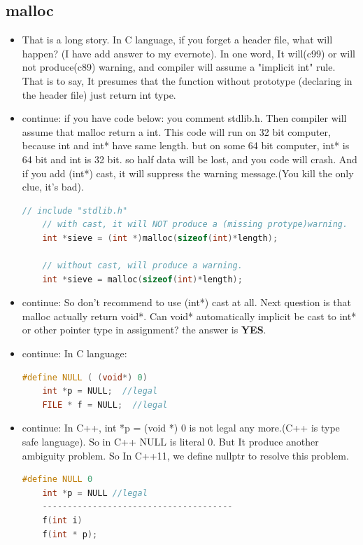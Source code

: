 \documentclass[a4paper,11pt,twoside]{book}
\begin{document}
\subsection{malloc}
\begin{itemize}
	\item That is a long story. In C language, if you forget a header file, what will happen? (I have add answer to my evernote). In one word, It will(c99) or will not produce(c89) warning, and compiler will assume a "implicit int" rule. That is to say, It presumes that the function without prototype (declaring in the header file) just return int type.
	
	\item continue: if you have code below: you comment stdlib.h. Then compiler will assume that malloc return a int.  This code will run on 32 bit computer, because int and int* have same length. but on some 64 bit computer, int* is 64 bit and int is 32 bit.  so half data will be lost, and you code will crash.
	And if you add (int*) cast, it will suppress the warning message.(You kill the only clue, it's bad).
	\begin{lstlisting}[frame=single, language=c++]
	// include "stdlib.h"
	// with cast, it will NOT produce a (missing protype)warning.
	int *sieve = (int *)malloc(sizeof(int)*length);
	
	// without cast, will produce a warning.
	int *sieve = malloc(sizeof(int)*length);
	\end{lstlisting}
	
	\item continue: So don't recommend to use (int*) cast at all. Next question is that malloc actually return void*. Can void* automatically implicit be cast to int* or other pointer type in assignment? the answer is \textbf{YES}.
	
	\item  continue: In C language:
	\begin{lstlisting}[frame=single, language=c++]
	#define NULL ( (void*) 0)
	int *p = NULL;  //legal
	FILE * f = NULL;  //legal
	\end{lstlisting}
	
	\item continue: In C++, int *p = (void *) 0 is not legal any more.(C++ is type safe language).  So in C++ NULL is literal 0. But It produce another ambiguity problem.  So In C++11, we define nullptr to resolve this problem.
	\begin{lstlisting}[frame=single, language=c++]
	#define NULL 0
	int *p = NULL //legal
	--------------------------------------
	f(int i)
	f(int * p);
	

\end{lstlisting}
\end{itemize}
\end{document}
